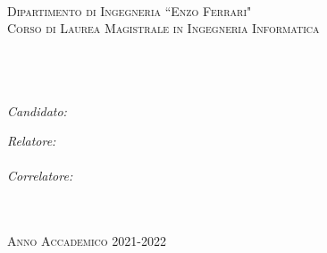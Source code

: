 \documentclass[11pt, oneside]{Thesis} %
\begin{document}
\begin{titlepage}

\begin{center}
\textsc{\Large \bf \univname}\\[0.5cm] %
\textsc{\large Dipartimento di Ingegneria ``Enzo Ferrari"}\\[0.2cm] %
\textsc{\large Corso di Laurea Magistrale in Ingegneria Informatica}\\[5.0cm] %

\HRule \\[0.6cm] %
{\huge \bfseries \ttitle}\\[0.4cm] %
\HRule \\[3.2 cm] %

\begin{minipage}{0.4\textwidth}
\begin{flushleft} \large
\emph{Candidato:}\\
\authornames %
\end{flushleft}
\end{minipage}
\begin{minipage}{0.4\textwidth}
\begin{flushright} \large
\emph{Relatore:} \\
\supname \\ %
\emph{Correlatore:} \\
\cosupname \\ %
\end{flushright}
\end{minipage}\\[5.0cm]


\textsc{\large Anno Accademico 2021-2022}\\[4cm] %

\vfill
\end{center}

\end{titlepage}
\end{document}
